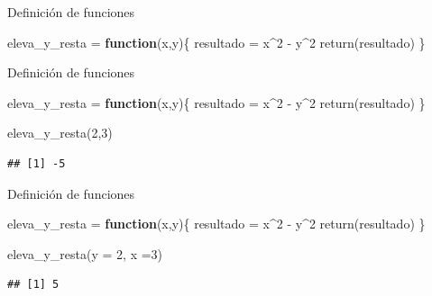 \documentclass[
  ignorenonframetext,
]{beamer}
\newenvironment{Shaded}{\begin{snugshade}}{\end{snugshade}}
\newcommand{\AttributeTok}[1]{\textcolor[rgb]{0.77,0.63,0.00}{#1}}
\newcommand{\ControlFlowTok}[1]{\textcolor[rgb]{0.13,0.29,0.53}{\textbf{#1}}}
\newcommand{\DecValTok}[1]{\textcolor[rgb]{0.00,0.00,0.81}{#1}}
\newcommand{\FunctionTok}[1]{\textcolor[rgb]{0.00,0.00,0.00}{#1}}
\newcommand{\NormalTok}[1]{#1}
\newcommand{\OtherTok}[1]{\textcolor[rgb]{0.56,0.35,0.01}{#1}}
\newcommand{\SpecialCharTok}[1]{\textcolor[rgb]{0.00,0.00,0.00}{#1}}
\begin{document}
\begin{frame}[fragile]{Definición de funciones}
\protect\hypertarget{definiciuxf3n-de-funciones-1}{}
\begin{Shaded}
\begin{Highlighting}[]
\NormalTok{eleva\_y\_resta }\OtherTok{=} \ControlFlowTok{function}\NormalTok{(x,y)\{}
\NormalTok{  resultado }\OtherTok{=}\NormalTok{ x}\SpecialCharTok{\^{}}\DecValTok{2} \SpecialCharTok{{-}}\NormalTok{ y}\SpecialCharTok{\^{}}\DecValTok{2}
  \FunctionTok{return}\NormalTok{(resultado)}
\NormalTok{\}}
\end{Highlighting}
\end{Shaded}
\end{frame}

\begin{frame}[fragile]{Definición de funciones}
\protect\hypertarget{definiciuxf3n-de-funciones-2}{}
\begin{Shaded}
\begin{Highlighting}[]
\NormalTok{eleva\_y\_resta }\OtherTok{=} \ControlFlowTok{function}\NormalTok{(x,y)\{}
\NormalTok{  resultado }\OtherTok{=}\NormalTok{ x}\SpecialCharTok{\^{}}\DecValTok{2} \SpecialCharTok{{-}}\NormalTok{ y}\SpecialCharTok{\^{}}\DecValTok{2}
  \FunctionTok{return}\NormalTok{(resultado)}
\NormalTok{\}}

\FunctionTok{eleva\_y\_resta}\NormalTok{(}\DecValTok{2}\NormalTok{,}\DecValTok{3}\NormalTok{)}
\end{Highlighting}
\end{Shaded}

\begin{verbatim}
## [1] -5
\end{verbatim}
\end{frame}

\begin{frame}[fragile]{Definición de funciones}
\protect\hypertarget{definiciuxf3n-de-funciones-3}{}
\begin{Shaded}
\begin{Highlighting}[]
\NormalTok{eleva\_y\_resta }\OtherTok{=} \ControlFlowTok{function}\NormalTok{(x,y)\{}
\NormalTok{  resultado }\OtherTok{=}\NormalTok{ x}\SpecialCharTok{\^{}}\DecValTok{2} \SpecialCharTok{{-}}\NormalTok{ y}\SpecialCharTok{\^{}}\DecValTok{2}
  \FunctionTok{return}\NormalTok{(resultado)}
\NormalTok{\}}

\FunctionTok{eleva\_y\_resta}\NormalTok{(}\AttributeTok{y =} \DecValTok{2}\NormalTok{, }\AttributeTok{x =}\DecValTok{3}\NormalTok{)}
\end{Highlighting}
\end{Shaded}

\begin{verbatim}
## [1] 5
\end{verbatim}
\end{frame}
\end{document}
